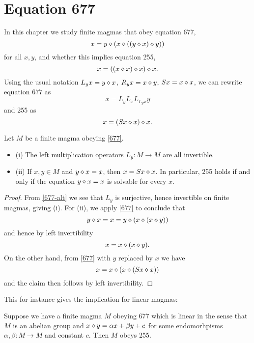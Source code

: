 \chapter{Equation 677}\label{677-chapter}

In this chapter we study finite magmas that obey equation 677,
\begin{equation}\label{677}
  x = y \diamond (x \diamond ((y \diamond x) \diamond y))
\end{equation}
for all $x,y$, and whether this implies equation 255,
\begin{equation}\label{255}
  x = ((x \diamond x) \diamond x) \diamond x.
\end{equation}
Using the usual notation $L_y x = y \diamond x$, $R_y x = x \diamond y$, $Sx = x \diamond x$, we can rewrite equation 677 as
\begin{equation}\label{677-alt}
  x = L_y L_x L_{L_y x} y
\end{equation}
and 255 as
$$ x = (Sx \diamond x) \diamond x.$$

\begin{lemma}\label{677-basic} Let $M$ be a finite magma obeying \eqref{677}.
  \begin{itemize}
  \item (i)  The left multiplication operators $L_y: M \to M$ are all invertible.
  \item (ii) If $x,y \in M$ and $y \diamond x = x$, then $x = Sx \diamond x$.  In particular, 255 holds if and only if the equation $y \diamond x = x$ is solvable for every $x$.
\end{itemize}
\end{lemma}

\begin{proof}  From \eqref{677-alt} we see that $L_y$ is surjective, hence invertible on finite magmas, giving (i).  For (ii), we apply \eqref{677} to conclude that
  $$ y \diamond x = x = y \diamond (x \diamond (x \diamond y))$$
  and hence by left invertibility
  $$ x = x \diamond (x \diamond y).$$
  On the other hand, from \eqref{677} with $y$ replaced by $x$ we have
  $$ x = x \diamond (x \diamond (Sx \diamond x))$$
  and the claim then follows by left invertibility.
\end{proof}

This for instance gives the implication for linear magmas:

\begin{lemma}\label{linear-obstruction}  Suppose we have a finite magma $M$ obeying 677 which is linear in the sense that $M$ is an abelian group and $x \diamond y = \alpha x + \beta y + c$ for some endomorhpisms $\alpha,\beta: M \to M$ and constant $c$.  Then $M$ obeys 255.
\end{lemma}

